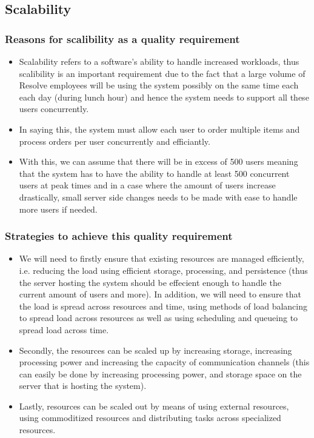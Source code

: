 \documentclass[a4paper,12pt]{article}
\begin{document}
\subsection{Scalability}
\subsubsection{Reasons for scalibility as a quality requirement}
\begin{itemize}
\item Scalability refers to a software's ability to handle increased workloads, thus scalibility is an important requirement due to the fact that a large volume of Resolve employees will be using the system possibly on the same time each each day (during lunch hour)  and hence the system needs to support all these users concurrently. 
\item In saying this, the system must allow each user to order multiple items and process orders per user concurrently and efficiantly.
\item With this, we can assume that there will be in excess of 500 users meaning that the system has to have the ability to handle at least 500 concurrent users at peak times and in a case where the amount of users increase drastically, small server side changes needs to be made with ease to handle more users if needed.
\end{itemize}

\subsubsection{Strategies to achieve this quality requirement}
\begin{itemize}
\item We will need to firstly ensure that existing resources are managed efficiently, i.e. reducing the load using efficient storage, processing,  and persistence (thus the server hosting the system should be effecient enough to handle the current amount of users and more). In addition, we will need to ensure that the load is spread across resources and time, using methods of load balancing to spread load across resources as well as using scheduling and queueing to spread load across time.
\item Secondly, the resources can be scaled up by increasing storage, increasing processing power and increasing the capacity of communication channels (this can easily be done by increasing processing power, and storage space on the server that is hosting the system).
\item Lastly, resources can be scaled out by means of using external resources, using commoditized resources and distributing tasks across specialized resources.
\end{itemize}
\end{document}
